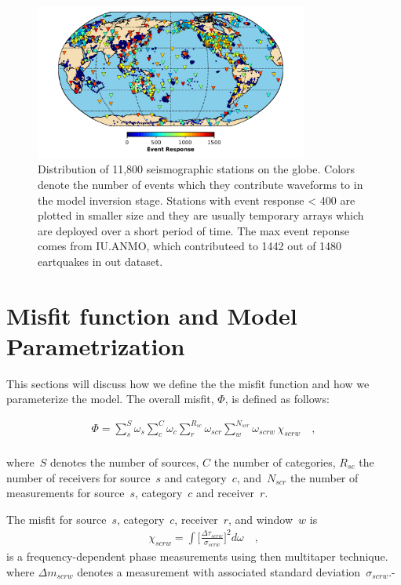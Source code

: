 \documentclass[extra,mreferee]{gji}
\begin{document}
\begin{figure}
  \includegraphics[width=0.8\textwidth]{figures/station_map.pdf}
  \caption{Distribution of 11,800 seismographic stations on the globe. Colors denote the number of events which they contribute waveforms to in the model inversion stage. Stations with event response < 400 are plotted in smaller size and they are usually temporary arrays which are deployed over a short period of time. The max event reponse comes from IU.ANMO, which contributeed to 1442 out of 1480 eartquakes in out dataset.}
  \label{fig:stations}
  \centering
\end{figure}

\section{Misfit function and Model Parametrization}

This sections will discuss how we define the the misfit function and how we parameterize the model.
The overall misfit, $\Phi$, is defined as follows:

\begin{align}
\label{eq:misfit}
\Phi = \sum_{s}^{S} \omega_s \sum_{c}^{C} \omega_{c} \sum_{r}^{R_{sc}} \omega_{scr} \sum_{w}^{N_{scr}} \omega_{scrw}\, \chi_{scrw}
\quad ,
\end{align}\\
where~$S$ denotes the number of sources, $C$ the number of categories,
$R_{sc}$ the number of receivers for source~$s$ and category~$c$,
and~$N_{scr}$ the number of measurements for source~$s$, category~$c$
and receiver~$r$.

The misfit for source~$s$, category~$c$, receiver~$r$, and window~$w$ is
\begin{align}
  \chi_{scrw} = \int \Big[ \frac {\Delta \tau_{scrw}} {\sigma_{scrw}} \Big]^2 d\omega
\quad ,
\end{align}
is a frequency-dependent phase measurements using then multitaper technique.
where $\Delta m_{scrw}$ denotes a measurement with associated standard deviation~$\sigma_{scrw}$.-
\end{document}
